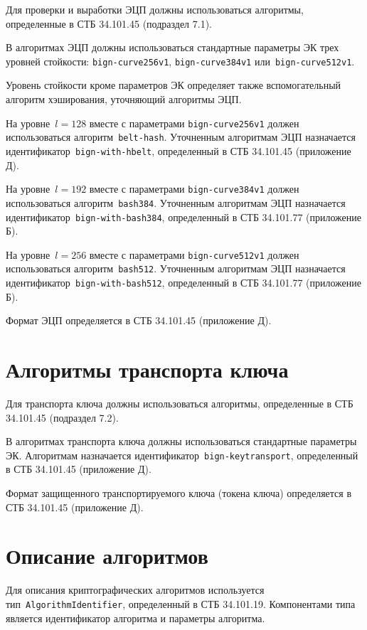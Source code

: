 Для проверки и выработки ЭЦП должны использоваться алгоритмы,
определенные в СТБ 34.101.45 (подраздел 7.1). 

В алгоритмах ЭЦП должны использоваться стандартные параметры
ЭК трех уровней стойкости: \texttt{bign-curve256v1}, 
\texttt{bign-curve384v1} или~\texttt{bign-curve512v1}.

Уровень стойкости кроме параметров ЭК 
определяет также вспомогательный алгоритм хэширования,
уточняющий алгоритмы ЭЦП.

На уровне~$l=128$ вместе с параметрами \texttt{bign-curve256v1}
должен использоваться алгоритм~\texttt{belt-hash}. 
Уточненным алгоритмам ЭЦП назначается идентификатор~\texttt{bign-with-hbelt}, 
определенный в СТБ 34.101.45 (приложение Д). 

На уровне~$l=192$ вместе с параметрами \texttt{bign-curve384v1}
должен использоваться алгоритм~\texttt{bash384}. 
Уточненным алгоритмам ЭЦП назначается 
идентификатор~\texttt{bign-with-bash384},  
определенный в СТБ 34.101.77 (приложение Б).

На уровне~$l=256$ вместе с параметрами \texttt{bign-curve512v1}
должен использоваться алгоритм~\texttt{bash512}. 
Уточненным алгоритмам ЭЦП назначается 
идентификатор~\texttt{bign-with-bash512},  
определенный в СТБ 34.101.77 (приложение Б).

Формат ЭЦП определяется в СТБ 34.101.45 (приложение Д).

\section{Алгоритмы транспорта ключа}\label{CRYPTO.Transport}

Для транспорта ключа должны использоваться алгоритмы,
определенные в СТБ 34.101.45 (подраздел 7.2). 

В алгоритмах транспорта ключа должны использоваться стандартные параметры 
ЭК. Алгоритмам назначается идентификатор~\texttt{bign-keytransport},
определенный в СТБ 34.101.45 (приложение Д).

Формат защищенного транспортируемого ключа (токена ключа)
определяется в СТБ 34.101.45 (приложение Д). 

\section{Описание алгоритмов}\label{CRYPTO.AlgId}

Для описания криптографических алгоритмов используется 
тип~\texttt{AlgorithmIdentifier}, определенный в СТБ 34.101.19.
Компонентами типа является идентификатор алгоритма и параметры
алгоритма. 

